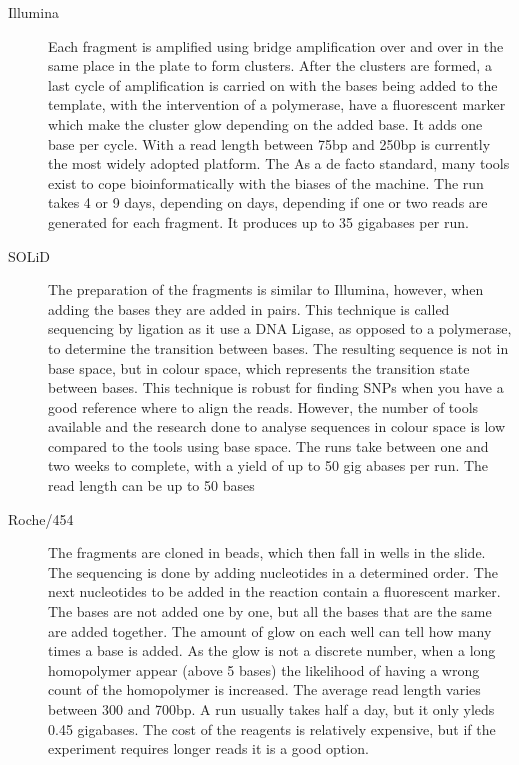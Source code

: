 \begin{description}
\item[Illumina] Each fragment is amplified using bridge amplification over and over in the same place in the plate to form clusters. After the clusters are formed, a last cycle of amplification is carried on with the bases being added to the template, with the intervention of a polymerase, have a fluorescent marker which make the cluster glow depending on the added base. It adds one base per cycle.     With a read length between 75bp and 250bp is currently the most widely adopted platform. The As a de facto standard, many tools exist to cope bioinformatically with the biases of the machine.  The run takes 4 or 9 days, depending on days, depending if one or two reads are generated for each fragment. It produces up to 35 gigabases per run. 

\item[SOLiD] The preparation of the fragments is similar to Illumina, however, when adding the bases they are added in pairs. This technique is called sequencing by ligation as it use a DNA Ligase, as opposed to a polymerase, to determine the transition between bases. The resulting sequence is not in base space, but in colour space, which represents the transition state between bases. This technique is robust for finding SNPs when you have a good reference where to align the reads. However, the number of tools available and the research done to analyse sequences in colour space is low compared to the tools using base space. The runs take between one and two weeks to complete, with a yield of up to 50 gig abases per run. The read length can be up to 50 bases

\item[Roche/454] The fragments are cloned in beads, which then fall in wells in the slide. The sequencing is done by adding nucleotides in a determined order. The next nucleotides to be added in the reaction contain a fluorescent marker. The bases are not added one by one, but all the bases that are the same are added together. The amount of glow on each well can tell how many times a base is added. As the glow is not a discrete number, when a long homopolymer appear (above 5 bases) the likelihood of having a wrong count of the homopolymer is increased.  The average read length varies between 300 and 700bp. A run usually takes half a day, but it only yleds 0.45 gigabases. The cost of the reagents is relatively expensive, but if the experiment requires longer reads it is a good option. 


\end{description}
